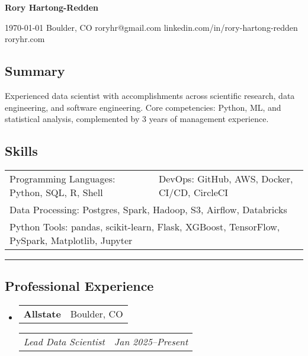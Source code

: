 \documentclass[10pt,letterpaper]{article}
\makeatletter
\newenvironment{indentsection}[1]
{\begin{list}{}%
	{\setlength{\leftmargin}{#1}}
	\item[]%
}
{\end{list}}
\newcommand{\headerrow}[2]{
\begin{tabular*}{\linewidth}{l@{\extracolsep{\fill}}r}
		#1 &
		#2 \\
	\end{tabular*}
}
\newcommand{\jobitem}[4]{\item \headerrow{\textbf{#1}}{#2}
\headerrow{\emph{#3}}{\emph{#4}}}
\makeatother
\begin{document}
{\raggedright \LARGE \bf Rory Hartong-Redden}

{\raggedleft 
\today \/ \textbar
\/ Boulder, CO \textbar
\/ roryhr@gmail.com \textbar
\/ linkedin.com/in/rory-hartong-redden \textbar
\/ roryhr.com
\\
}


\subsection*{Summary}
\begin{centering}
Experienced data scientist with accomplishments across scientific research, data engineering, and software engineering. 
Core competencies: Python, ML, and statistical analysis, complemented by 3 years of management experience. 
\end{centering}

\subsection*{Skills}

\begin{indentsection}{\parindent}
\begin{tabular}{p{0.5\linewidth}   p{0.5\linewidth}} 
	Programming Languages: Python, SQL, R, Shell
	& DevOps: GitHub, AWS, Docker,  CI/CD, CircleCI \\

	\multicolumn{2}{l}{Data Processing: Postgres, Spark, Hadoop, S3, Airflow, Databricks} \\
	\multicolumn{2}{l}{
		Python Tools: pandas, scikit-learn, Flask, XGBoost, TensorFlow, PySpark, Matplotlib, Jupyter
		}
\end{tabular}
\end{indentsection}

\hrule
\subsection*{Professional Experience}
\begin{itemize}
	\jobitem{Allstate}{Boulder, CO}
		     {Lead Data Scientist}{Jan 2025--Present}
\end{itemize}
\end{document}
